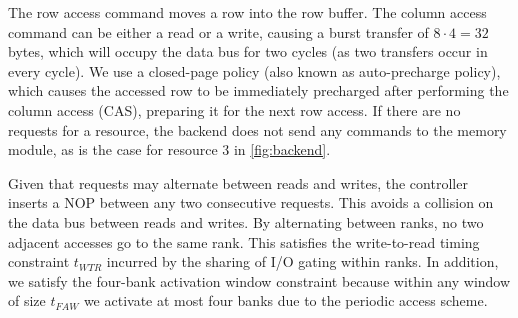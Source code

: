 

The row access command moves a row into the row buffer.
The column access command can be either a read or a write, causing a burst transfer of $8 \cdot 4 = 32$ bytes, which will occupy the data bus for two cycles (as two transfers occur in every cycle).
We use a closed-page policy (also known as auto-precharge policy), which causes the accessed row to be immediately precharged after performing the column access (CAS), preparing it for the next row access.
If there are no requests for a resource, the backend does not send any commands to the memory module, as is the case for resource 3 in \ref{fig:backend}.


%

Given that requests may alternate between reads and writes, the controller inserts a NOP between any two consecutive requests. 
This avoids a collision on the data bus between reads and writes. 
By alternating between ranks, no two adjacent accesses go to the same rank.
This satisfies the write-to-read timing constraint $t_{WTR}$ incurred by the sharing of I/O gating within ranks.
In addition, we satisfy the four-bank activation window constraint because within any window of size $t_{FAW}$ we activate at most four banks due to the periodic access scheme. 

